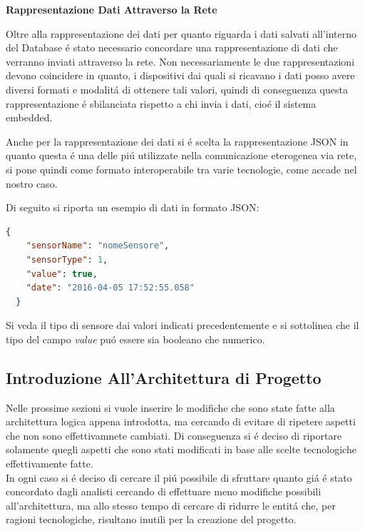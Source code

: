 \newpage

\begin{center}
  \textbf{Rappresentazione Dati Attraverso la Rete}
\end{center}

Oltre alla rappresentazione dei dati per quanto riguarda i dati salvati all'interno del Database \'e stato necessario concordare una rappresentazione di dati che verranno inviati attraverso la rete. Non necessariamente le due rappresentazioni devono coincidere in quanto, i dispositivi dai quali si ricavano i dati posso avere diversi formati e modalit\'a di ottenere tali valori, quindi di conseguenza questa rappresentazione \'e sbilanciata rispetto a chi invia i dati, cio\'e il sistema embedded.

Anche per la rappresentazione dei dati si \'e scelta la rappresentazione JSON in quanto questa \'e una delle pi\'u utilizzate nella comunicazione eterogenea via rete, si pone quindi come formato interoperabile tra varie tecnologie, come accade nel nostro caso.

Di seguito si riporta un esempio di dati in formato JSON:

\begin{lstlisting}[language=json]
  {
    "sensorName": "nomeSensore",
    "sensorType": 1,
    "value": true,
    "date": "2016-04-05 17:52:55.058"
  }
\end{lstlisting}

Si veda il tipo di sensore dai valori indicati precedentemente e si sottolinea che il tipo del campo \textit{value} pu\'o essere sia booleano che numerico.

\subsection{Introduzione All'Architettura di Progetto}

Nelle prossime sezioni si vuole inserire le modifiche che sono state fatte alla architettura logica appena introdotta, ma cercando di evitare di ripetere aspetti che non sono effettivamnete cambiati. Di conseguenza si \'e deciso di riportare solamente quegli aspetti che sono stati modificati in base alle scelte tecnologiche effettivamente fatte.\\
In ogni caso si \'e deciso di cercare il pi\'u possibile di sfruttare quanto gi\'a \'e stato concordato dagli analisti cercando di effettuare meno modifiche possibili all'architettura, ma allo stesso tempo di cercare di ridurre le entit\'a che, per ragioni tecnologiche, risultano inutili per la creazione del progetto.

